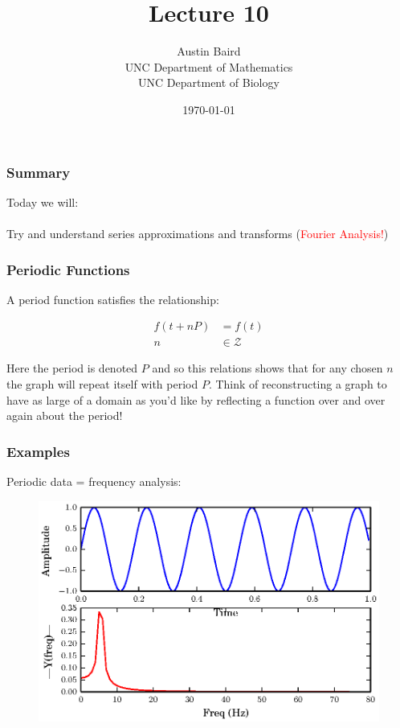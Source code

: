 \documentclass[serif]{beamer}
\title{Lecture 10}
\author{Austin Baird\\UNC Department of Mathematics\\UNC Department of Biology}
\date{\today}
\begin{document}
\frame{\titlepage}

\begin{frame}
\frametitle{Summary}

Today we will: 
\ \\
\ \\
Try and understand series approximations and transforms (\textcolor{red}{Fourier Analysis!}) 
\end{frame}

\begin{frame}
\frametitle{Periodic Functions}

A period function satisfies the relationship: 

\begin{align*}
f(t+nP) &= f(t)\\
n &\in \mathcal{Z}
\end{align*}

Here the period is denoted $P$ and so this relations shows that for any chosen $n$ the graph will repeat itself with period $P$. Think of reconstructing a graph to have as large of a domain as you'd like by reflecting a function over and over again about the period!


\end{frame}





\begin{frame}
\frametitle{Examples} 

Periodic data = frequency analysis: 

\begin{figure}[h]
\includegraphics[width=\textwidth,height=0.7\textheight]{./freq}
\end{figure}
 

\end{frame}
\end{document}

